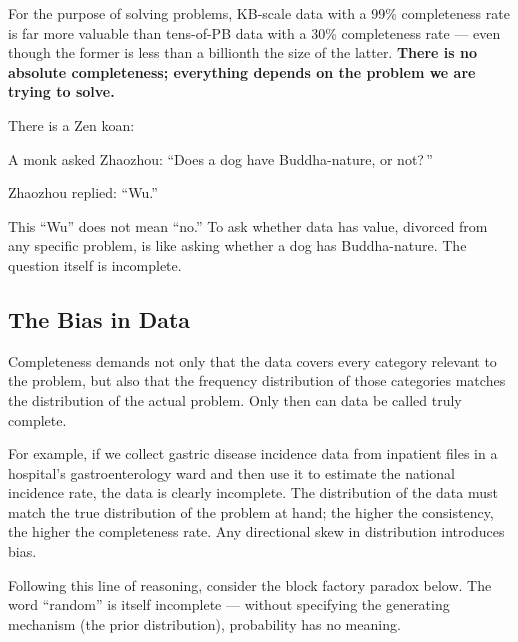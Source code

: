 \vspace{1em}

For the purpose of solving problems, KB-scale data with a 99\% completeness rate is far more valuable than tens-of-PB data with a 30\% completeness rate ---
even though the former is less than a billionth the size of the latter.
\textbf{There is no absolute completeness; everything depends on the problem we are trying to solve.}

\vspace{1em}

There is a Zen koan:

\begin{myquote}
A monk asked Zhaozhou: ``Does a dog have Buddha-nature, or not?\,''

Zhaozhou replied: ``Wu.''
\end{myquote}

This ``Wu'' does not mean ``no.''
To ask whether data has value, divorced from any specific problem, is like asking whether a dog has Buddha-nature.
The question itself is incomplete.

\subsection{The Bias in Data}
Completeness demands not only that the data covers every category relevant to the problem, but also that the frequency distribution of those categories matches the distribution of the actual problem. Only then can data be called truly complete.

\vspace{1em}

For example, if we collect gastric disease incidence data from inpatient files in a hospital's gastroenterology ward and then use it to estimate the national incidence rate, the data is clearly incomplete. The distribution of the data must match the true distribution of the problem at hand; the higher the consistency, the higher the completeness rate. Any directional skew in distribution introduces bias.

\vspace{1em}

Following this line of reasoning, consider the block factory paradox below.
The word ``random'' is itself incomplete --- without specifying the generating mechanism (the prior distribution), probability has no meaning.

\vspace{1em}

